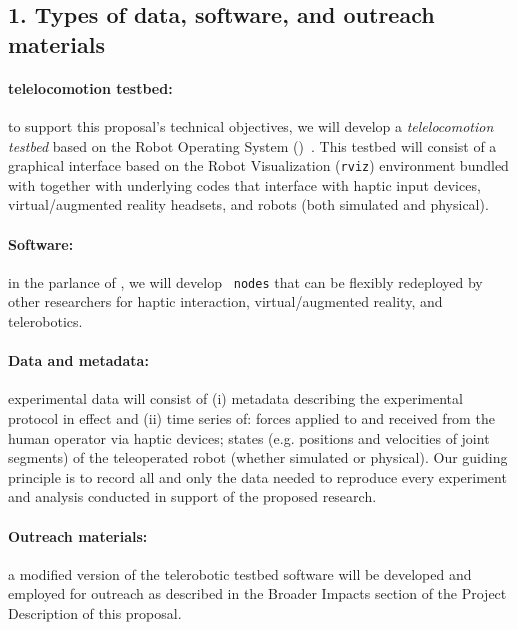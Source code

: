\documentclass[11pt]{article}
\begin{document}
\subsection*{1. Types of data, software, and outreach materials}

\paragraph{telelocomotion testbed:}
to support this proposal's technical objectives, we will develop a \emph{telelocomotion testbed} based on the Robot Operating System ({\tt\ROS})~.
This testbed will consist of a graphical interface based on the Robot Visualization ({\tt rviz}) environment bundled with {\tt\ROS} together with underlying codes that interface with haptic input devices, virtual/augmented reality headsets, and robots (both simulated and physical).


\paragraph{Software:}
in the parlance of {\tt\ROS}, we will develop {\tt{\ROS} nodes} that can be flexibly redeployed by other researchers for
haptic interaction,
virtual/augmented reality,
and
telerobotics.

\paragraph{Data and metadata:}
experimental data will consist of
(i) metadata describing the experimental protocol in effect
and
(ii) time series of:
forces applied to and received from the human operator via haptic devices;
states (e.g. positions and velocities of joint segments) of the teleoperated robot (whether simulated or physical).
Our guiding principle is to record all and only the data needed to reproduce every experiment and analysis conducted in support of the proposed research.

\paragraph{Outreach materials:}
a modified version of the telerobotic testbed software will be developed and employed for {\KTW} {\STEM} outreach as described in the Broader Impacts section of the Project Description of this proposal.
\end{document}
